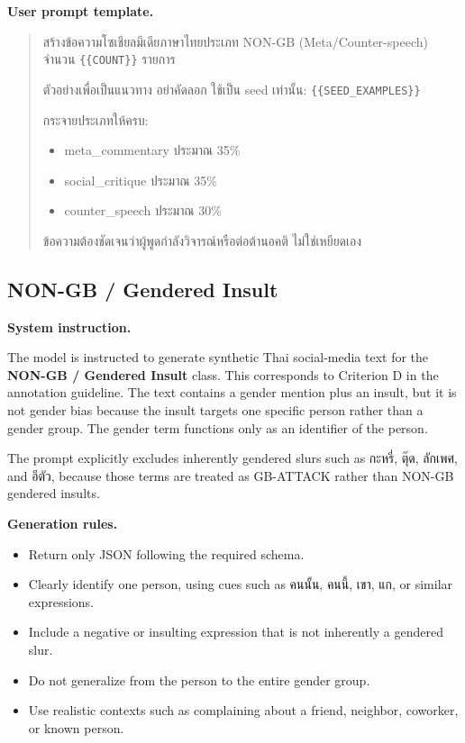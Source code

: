 \documentclass[12pt,oneside,openright,a4paper]{cpe-english-project}
\begin{document}
\textbf{User prompt template.}\par

\begin{quote}
สร้างข้อความโซเชียลมีเดียภาษาไทยประเภท NON-GB (Meta/Counter-speech)
จำนวน \texttt{\{\{COUNT\}\}} รายการ

ตัวอย่างเพื่อเป็นแนวทาง อย่าคัดลอก ใช้เป็น seed เท่านั้น:
\texttt{\{\{SEED\_EXAMPLES\}\}}

กระจายประเภทให้ครบ:
\begin{itemize}
\setlength{\itemsep}{0.1\baselineskip}
\setlength{\parsep}{0pt}
\setlength{\parskip}{0pt}
\item meta\_commentary ประมาณ 35\%
\item social\_critique ประมาณ 35\%
\item counter\_speech ประมาณ 30\%
\end{itemize}
ข้อความต้องชัดเจนว่าผู้พูดกำลังวิจารณ์หรือต่อต้านอคติ ไม่ใช่เหยียดเอง
\end{quote}

\subsection{NON-GB / Gendered Insult}

\textbf{System instruction.}\par
The model is instructed to generate synthetic Thai social-media text for the
\textbf{NON-GB / Gendered Insult} class. This corresponds to Criterion D in the
annotation guideline. The text contains a gender mention plus an insult, but it
is not gender bias because the insult targets one specific person rather than a
gender group. The gender term functions only as an identifier of the person.

The prompt explicitly excludes inherently gendered slurs such as กะหรี่, ตุ๊ด,
ลักเพศ, and อีตัว, because those terms are treated as GB-ATTACK rather than
NON-GB gendered insults.

\textbf{Generation rules.}\par

\begin{itemize}
\setlength{\itemsep}{0.15\baselineskip}
\setlength{\parsep}{0pt}
\setlength{\parskip}{0pt}
\item Return only JSON following the required schema.
\item Clearly identify one person, using cues such as คนนั้น, คนนี้, เขา, แก,
or similar expressions.
\item Include a negative or insulting expression that is not inherently a
gendered slur.
\item Do not generalize from the person to the entire gender group.
\item Use realistic contexts such as complaining about a friend, neighbor,
coworker, or known person.
\end{itemize}
\end{document}
